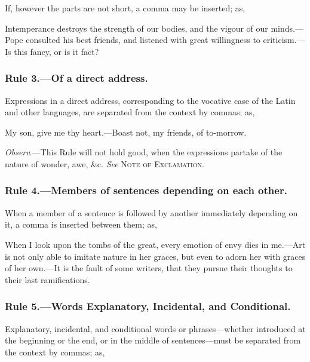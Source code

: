 If, however the parts are not short, a comma may be inserted; as,

\begin{example}
    Intemperance destroys the strength of our bodies, and the vigour of our
    minds.---Pope consulted his best friends, and listened with great
    willingness to criticism.---Is this fancy, or is it fact?
\end{example}

\subsubsection{Rule 3.---Of a direct address.}

Expressions in a direct address, corresponding to the vocative case of the Latin
and other languages, are separated from the context by commas; as,

\begin{example}
    My son, give me thy heart.---Boast not, my friends, of to-morrow.
\end{example}

\emph{Observ}.---This Rule will not hold good, when the expressions partake of
the nature of wonder, awe, \&c. \emph{See} \textsc{Note of Exclamation.}

\subsubsection{Rule 4.---Members of sentences depending on each other.}

When a member of a sentence is followed by another immediately depending on it,
a comma is inserted between them; as,

\begin{example}
    When I look upon the tombs of the great, every emotion of envy dies in
    me.---Art is not only able to imitate nature in her graces, but even to
    adorn her with graces of her own.---It is the fault of some writers, that
    they pursue their thoughts to their last ramifications.
\end{example}

\subsubsection{Rule 5.---Words Explanatory, Incidental, and Conditional.}

Explanatory, incidental, and conditional words or phrases---whether introduced
at the beginning or the end, or in the middle of sentences---must be separated
from the context by commas; as,

